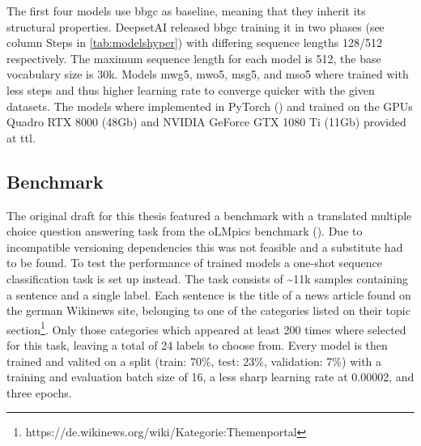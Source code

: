 The first four models use bbgc as baseline, meaning that they inherit its structural properties.
DeepsetAI released bbgc training it in two phases (see column Steps in \autoref{tab:modelshyper}) with differing sequence lengths 128/512 respectively.
The maximum sequence length for each model is 512, the base vocabulary size is 30k.
Models mwg5, mwo5, msg5, and mso5 where trained with less steps and thus higher learning rate to converge quicker with the given datasets.
The models where implemented in PyTorch (\textcite{pytorch}) and trained on the GPUs Quadro RTX 8000 (48Gb) and NVIDIA GeForce GTX 1080 Ti (11Gb) provided at \ac{ttl}.

\subsection{Benchmark}
\label{subsec:benchmark-implementation}
The original draft for this thesis featured a benchmark with a translated multiple choice question answering task from the oLMpics benchmark (\cite{olmpics}).
Due to incompatible versioning dependencies this was not feasible and a substitute had to be found.
To test the performance of trained models a one-shot sequence classification task is set up instead.
The task consists of \textasciitilde11k samples containing a sentence and a single label.
Each sentence is the title of a news article found on the german Wikinews site, belonging to one of the categories listed on their topic section\footnote{https://de.wikinews.org/wiki/Kategorie:Themenportal}.
Only those categories which appeared at least 200 times where selected for this task, leaving a total of 24 labels to choose from.
Every model is then trained and valited on a split (train: 70\%, test: 23\%, validation: 7\%) with a training and evaluation batch size of 16, a less sharp learning rate at 0.00002, and three epochs.
